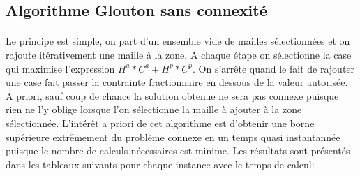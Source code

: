 \documentclass[a4paper, 11pt]{article} %
\begin{document}
\subsection{Algorithme Glouton sans connexité}

\paragraph*{}
Le principe est simple, on part d'un ensemble vide de mailles sélectionnées et on rajoute itérativement une maille à la zone. A chaque étape on sélectionne la case qui maximise l'expression $H^a*C^a+H^p*C^p$. On s'arrête quand le fait de rajouter une case fait passer la contrainte fractionnaire en dessous de la valeur autorisée. A priori, sauf coup de chance la solution obtenue ne sera pas connexe puisque rien ne l'y oblige lorsque l'on sélectionne la maille à ajouter à la zone sélectionnée. L'intérêt a priori de cet algorithme est d'obtenir une borne supérieure extrêmement du problème connexe en un temps quasi instantannée puisque le nombre de calculs nécessaires est minime. Les résultats sont présentés dans les tableaux suivants pour chaque instance avec le temps de calcul:
\end{document}
